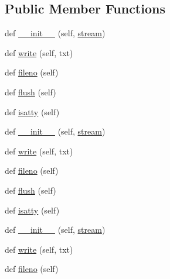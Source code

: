 \subsection*{Public Member Functions}
\begin{DoxyCompactItemize}
\item 
def \hyperlink{classwaflib_1_1_logs_1_1sync__stream_acb5884a14ea3783d42b6e85d0c7cec37}{\+\_\+\+\_\+init\+\_\+\+\_\+} (self, \hyperlink{classwaflib_1_1_logs_1_1sync__stream_aded1f86a06bb9629cf84510dfb0e10fd}{stream})
\item 
def \hyperlink{classwaflib_1_1_logs_1_1sync__stream_aeadb7ea2e4d720db84895bf5544f8631}{write} (self, txt)
\item 
def \hyperlink{classwaflib_1_1_logs_1_1sync__stream_a6edc1da128e5a27c857335a360408654}{fileno} (self)
\item 
def \hyperlink{classwaflib_1_1_logs_1_1sync__stream_a27a7cd9b26568e66f4a5a8e640dfc67a}{flush} (self)
\item 
def \hyperlink{classwaflib_1_1_logs_1_1sync__stream_ab2c7f6c6ed9124156995bf1afd32f4e8}{isatty} (self)
\item 
def \hyperlink{classwaflib_1_1_logs_1_1sync__stream_acb5884a14ea3783d42b6e85d0c7cec37}{\+\_\+\+\_\+init\+\_\+\+\_\+} (self, \hyperlink{classwaflib_1_1_logs_1_1sync__stream_aded1f86a06bb9629cf84510dfb0e10fd}{stream})
\item 
def \hyperlink{classwaflib_1_1_logs_1_1sync__stream_aeadb7ea2e4d720db84895bf5544f8631}{write} (self, txt)
\item 
def \hyperlink{classwaflib_1_1_logs_1_1sync__stream_a6edc1da128e5a27c857335a360408654}{fileno} (self)
\item 
def \hyperlink{classwaflib_1_1_logs_1_1sync__stream_a27a7cd9b26568e66f4a5a8e640dfc67a}{flush} (self)
\item 
def \hyperlink{classwaflib_1_1_logs_1_1sync__stream_ab2c7f6c6ed9124156995bf1afd32f4e8}{isatty} (self)
\item 
def \hyperlink{classwaflib_1_1_logs_1_1sync__stream_acb5884a14ea3783d42b6e85d0c7cec37}{\+\_\+\+\_\+init\+\_\+\+\_\+} (self, \hyperlink{classwaflib_1_1_logs_1_1sync__stream_aded1f86a06bb9629cf84510dfb0e10fd}{stream})
\item 
def \hyperlink{classwaflib_1_1_logs_1_1sync__stream_aeadb7ea2e4d720db84895bf5544f8631}{write} (self, txt)
\item 
def \hyperlink{classwaflib_1_1_logs_1_1sync__stream_a6edc1da128e5a27c857335a360408654}{fileno} (self)
\item 

\end{DoxyCompactItemize}
